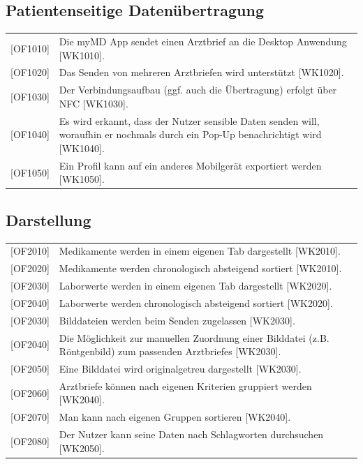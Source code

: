 \documentclass[a4paper]{scrreprt}
\begin{document}
\subsection{Patientenseitige Datenübertragung}
\begin{tabular}{lll}
[OF1010]&  \multicolumn{2}{p{12cm}}{Die myMD \gls{App} sendet einen Arztbrief an die \gls{Desktop Anwendung} [WK1010].}\\
{[OF1020]} &  \multicolumn{2}{p{12cm}}{Das Senden von mehreren Arztbriefen wird unterstützt [WK1020].}  \\
{[OF1030]} &  \multicolumn{2}{p{12cm}}{Der Verbindungsaufbau (ggf. auch die Übertragung) erfolgt über \gls{NFC} [WK1030].}  \\
{[OF1040]} &  \multicolumn{2}{p{12cm}}{Es wird erkannt, dass der Nutzer sensible Daten senden will, woraufhin er nochmals durch ein Pop-Up benachrichtigt wird [WK1040].}  \\
{[OF1050]} &  \multicolumn{2}{p{12cm}}{Ein Profil kann auf ein anderes Mobilgerät exportiert werden [WK1050].}  \\

\end{tabular}

\subsection{Darstellung}
\begin{tabular}{lll}
[OF2010]&  \multicolumn{2}{p{12cm}}{Medikamente werden in einem eigenen Tab dargestellt [WK2010].}\\
{[OF2020]}&  \multicolumn{2}{p{12cm}}{Medikamente werden chronologisch absteigend sortiert [WK2010].}\\
{[OF2030]}&  \multicolumn{2}{p{12cm}}{Laborwerte werden in einem eigenen Tab dargestellt [WK2020].}\\
{[OF2040]}&  \multicolumn{2}{p{12cm}}{Laborwerte werden chronologisch absteigend sortiert [WK2020].}\\
{[OF2030]} &  \multicolumn{2}{p{12cm}}{Bilddateien werden beim Senden zugelassen [WK2030].}  \\
{[OF2040]} &  \multicolumn{2}{p{12cm}}{Die Möglichkeit zur manuellen Zuordnung einer Bilddatei (z.B. Röntgenbild) zum passenden Arztbriefes [WK2030].}  \\
{[OF2050]} &  \multicolumn{2}{p{12cm}}{Eine Bilddatei wird originalgetreu dargestellt [WK2030].}  \\
{[OF2060]} &  \multicolumn{2}{p{12cm}}{Arztbriefe können nach eigenen Kriterien gruppiert werden [WK2040].}  \\
{[OF2070]} &  \multicolumn{2}{p{12cm}}{Man kann nach eigenen Gruppen sortieren [WK2040].}  \\
{[OF2080]} &  \multicolumn{2}{p{12cm}}{Der Nutzer kann seine Daten nach Schlagworten durchsuchen [WK2050].}  \\

\end{tabular}
\end{document}
